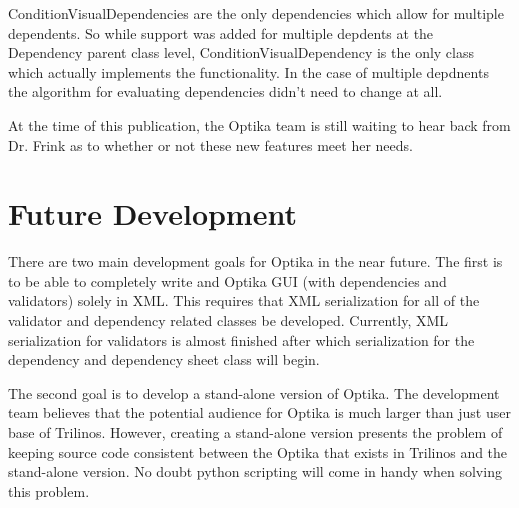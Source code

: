 ConditionVisualDependencies are the only dependencies which allow for multiple dependents. So while support was added for multiple depdents at the
Dependency parent class level, ConditionVisualDependency is the only class which actually implements the functionality. In the case of multiple depdnents the algorithm
for evaluating dependencies didn't need to change at all.

At the time of this publication, the Optika team is still waiting to hear back from Dr. Frink as to whether or not these new features meet her needs.

\section{Future Development}
There are two main development goals for Optika in the near future. The first is to be able to completely write and Optika GUI (with dependencies and validators)
solely in XML. This requires that XML serialization for all of the validator and dependency related classes be developed. Currently,
XML serialization for validators is almost finished after which serialization for the dependency and dependency sheet class will begin.

The second goal is to develop a stand-alone version of Optika. The development team believes that the potential audience for Optika is much 
larger than just user base of Trilinos. However, creating a stand-alone version presents the problem of keeping source code consistent between
the Optika that exists in Trilinos and the stand-alone version. No doubt python scripting will come in handy when solving this problem.

